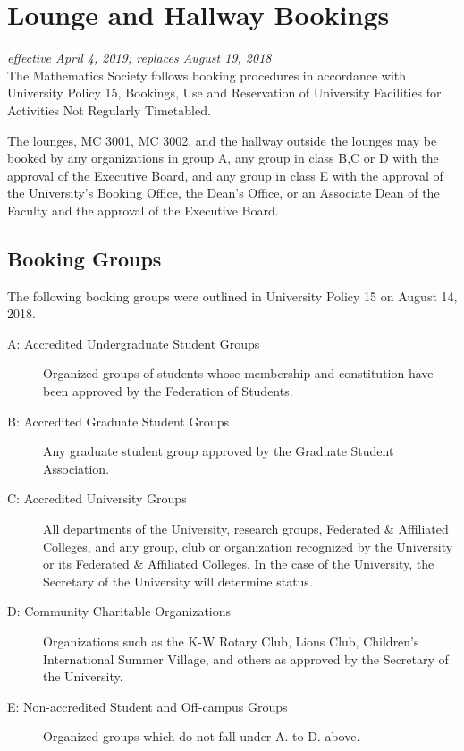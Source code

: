 \section{Lounge and Hallway Bookings}
\emph{effective April 4, 2019; replaces August 19, 2018}\\

The Mathematics Society follows booking procedures in accordance with 
University Policy 15, Bookings, Use and Reservation of University Facilities
for Activities Not Regularly Timetabled. 

The lounges, MC 3001, MC 3002, and the hallway outside the lounges may be
booked by any organizations in group A, any group in class B,C or D with the approval of the Executive Board, and any group in class E with the approval of the University’s Booking Office, the Dean’s Office, or an Associate Dean of the Faculty and the approval of the Executive Board.


\subsection{Booking Groups}

The following booking groups were outlined in University Policy 15 on 
August 14, 2018.

\begin{description}
\item[A: Accredited Undergraduate Student Groups] Organized groups of students
    whose membership and constitution have been approved by the Federation of
    Students.

\item[B: Accredited Graduate Student Groups] Any graduate student group
    approved by the Graduate Student Association.

\item[C: Accredited University Groups] All departments of the University,
    research groups, Federated \& Affiliated Colleges, and any group, club or
    organization recognized by the University or its Federated \& Affiliated
    Colleges. In the case of the University, the Secretary of the University
    will determine status.

\item[D: Community Charitable Organizations] Organizations such as the K-W
    Rotary Club, Lions Club, Children's International Summer Village, and
    others as approved by the Secretary of the University.

\item[E: Non-accredited Student and Off-campus Groups] Organized groups which
    do not fall under A. to D. above.
\end{description}


